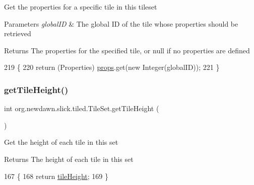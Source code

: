 Get the properties for a specific tile in this tileset


\begin{DoxyParams}{Parameters}
{\em global\+ID} & The global ID of the tile whose properties should be retrieved \\
\hline
\end{DoxyParams}
\begin{DoxyReturn}{Returns}
The properties for the specified tile, or null if no properties are defined 
\end{DoxyReturn}

\begin{DoxyCode}
219                                                   \{
220         \textcolor{keywordflow}{return} (Properties) \mbox{\hyperlink{classorg_1_1newdawn_1_1slick_1_1tiled_1_1_tile_set_ada3988681e613aa9884649c19509d29c}{props}}.get(\textcolor{keyword}{new} Integer(globalID));
221     \}
\end{DoxyCode}
\mbox{\label{classorg_1_1newdawn_1_1slick_1_1tiled_1_1_tile_set_aa74f0092cb827be4c3eed1efdbee66a2}} 
\subsubsection{\texorpdfstring{get\+Tile\+Height()}{getTileHeight()}}
{\footnotesize\ttfamily int org.\+newdawn.\+slick.\+tiled.\+Tile\+Set.\+get\+Tile\+Height (\begin{DoxyParamCaption}{ }\end{DoxyParamCaption})\hspace{0.3cm}{\ttfamily [inline]}}

Get the height of each tile in this set

\begin{DoxyReturn}{Returns}
The height of each tile in this set 
\end{DoxyReturn}

\begin{DoxyCode}
167                                \{
168         \textcolor{keywordflow}{return} \mbox{\hyperlink{classorg_1_1newdawn_1_1slick_1_1tiled_1_1_tile_set_aeecbe9c64da988364b3513c4eaa231c2}{tileHeight}};
169     \}
\end{DoxyCode}
\mbox{\label{classorg_1_1newdawn_1_1slick_1_1tiled_1_1_tile_set_a7182432acea55d877c66e1cea4e6f413}} 
